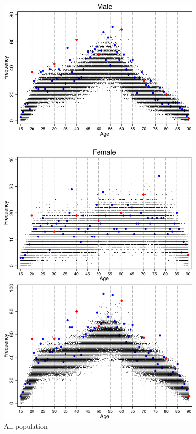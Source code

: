 \documentclass{beamer}
\begin{document}
\begin{frame}

\begin{figure}
	\centering
	\begin{minipage}{0.5\textwidth}
		\centering
		\includegraphics[width=0.9\textwidth]{suicide1.png} %
	\end{minipage}\hfill
	\begin{minipage}{0.5\textwidth}
		\centering
		\includegraphics[width=0.9\textwidth]{suicide2.png} %
		\caption{All population}
	\end{minipage}
\end{figure}

\end{frame}
\end{document}
